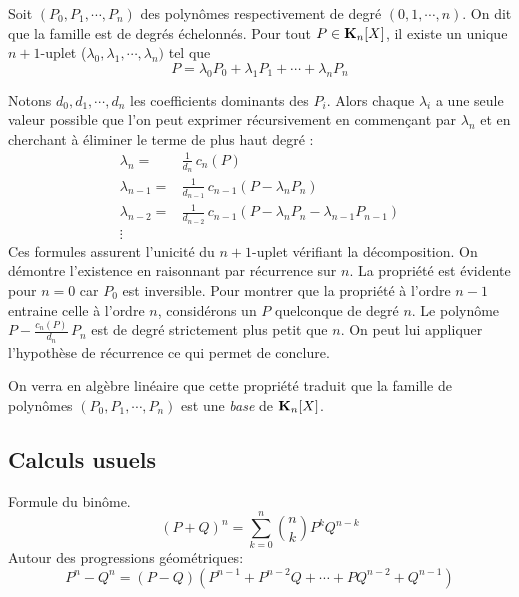 \begin{prop}
 Soit $(P_0,P_1,\cdots,P_n)$ des polynômes respectivement de degré $(0,1,\cdots,n)$. On dit que la famille est de degrés échelonnés. Pour tout $P\in \mathbf{K}_n[X]$, il existe un unique $n+1$-uplet ($\lambda_0,\lambda_1,\cdots,\lambda_n)$ tel que
\begin{displaymath}
 P = \lambda_0 P_0 + \lambda_1 P_1 + \cdots + \lambda_n P_n
\end{displaymath}
\end{prop}
\begin{demo}
 Notons $d_0,d_1,\cdots,d_n$ les coefficients dominants des $P_i$. Alors chaque $\lambda_i$ a une seule valeur possible que l'on peut exprimer récursivement en commençant par $\lambda_n$ et en cherchant à éliminer le terme de plus haut degré :
\begin{align*}
 \lambda_n =& \frac{1}{d_n}\,c_n(P)\\
 \lambda_{n-1} =& \frac{1}{d_{n-1}}\,c_{n-1}(P-\lambda_nP_n)\\
 \lambda_{n-2} =& \frac{1}{d_{n-2}}\,c_{n-1}(P-\lambda_nP_n - \lambda_{n-1}P_{n-1})\\   \vdots&
\end{align*}
Ces formules assurent l'unicité du $n+1$-uplet vérifiant la décomposition.\newline
On démontre l'existence en raisonnant par récurrence sur $n$. La propriété est évidente pour $n=0$ car $P_0$ est inversible. Pour montrer que la propriété à l'ordre $n-1$ entraine celle à l'ordre $n$, considérons un $P$ quelconque de degré $n$. Le polynôme $P - \frac{c_n(P)}{d_n}\,P_n$ est de degré strictement plus petit que $n$. On peut lui appliquer l'hypothèse de récurrence ce qui permet de conclure.
\end{demo}
\begin{rem}
 On verra en algèbre linéaire que cette propriété traduit que la famille de polynômes $(P_0,P_1,\cdots,P_n)$ est une \emph{base} de $\mathbf{K}_n[X]$.
\end{rem}

\subsection{Calculs usuels}
Formule du binôme. 
\begin{displaymath}
  (P+Q)^n = \sum_{k=0}^n \binom{n}{k}P^k Q^{n-k}
\end{displaymath}
Autour des progressions géométriques:
\begin{displaymath}
  P^n - Q^n = (P-Q)(P^{n-1} +P^{n-2}Q + \cdots + PQ^{n-2} + Q^{n-1})
\end{displaymath}

